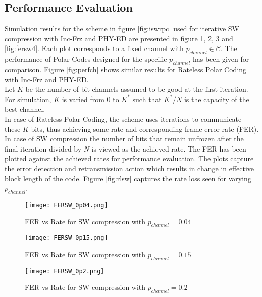 \documentclass[
11pt, %
a4paper, %
oneside, %
headinclude,footinclude, %
BCOR5mm, %
]{scrartcl}
\begin{document}
\clearpage
\subsection{Performance Evaluation}
Simulation results for the scheme in figure \ref{fig:iswrpc} used for iterative SW compression with Inc-Frz and PHY-ED are presented in figure \ref{fig:fersw1}, \ref{fig:fersw2}, \ref{fig:fersw3} and \ref{fig:fersw4}.
Each plot corresponds to a fixed channel with $p_{channel} \in \mathcal{C}$. The performance of Polar Codes designed for the specific $p_{channel}$ has been given for comparison. Figure \ref{fig:perfch} shows similar results for Rateless Polar Coding with Inc-Frz and PHY-ED.\\
Let $K$ be the number of bit-channels assumed to be good at the first iteration. For simulation, $K$ is varied from $0$ to $K^*$ such that $K^*/N$ is the capacity of the best channel.\\ In case of Rateless Polar Coding, the scheme uses iterations to communicate these $K$ bits, thus achieving some rate and corresponding frame error rate (FER). In case of SW compression the number of bits that remain unfrozen after the final iteration divided by $N$ is viewed as the achieved rate. The FER has been plotted against the achieved rates for performance evaluation. The plots capture the error detection and retransmission action which results in change in effective block length of the code. Figure \ref{fig:rlsw} captures the rate loss seen for varying $p_{channel}$.  
\begin{figure}[h!]
 \begin{center}
    \texttt{[image: FERSW\_0p04.png]}
  \end{center}
  \caption{FER vs Rate for SW compression with $p_{channel}=0.04$}
  \label{fig:fersw1}
\end{figure}
\begin{figure}[h!]
 \begin{center}
    \texttt{[image: FERSW\_0p15.png]}
  \end{center}
  \caption{FER vs Rate for SW compression with $p_{channel}=0.15$ }
  \label{fig:fersw2}
\end{figure}
\begin{figure}[h!]
 \begin{center}
    \texttt{[image: FERSW\_0p2.png]}
  \end{center}
  \caption{FER vs Rate for SW compression with $p_{channel}=0.2$ }
  \label{fig:fersw3}
\end{figure}
\end{document}
